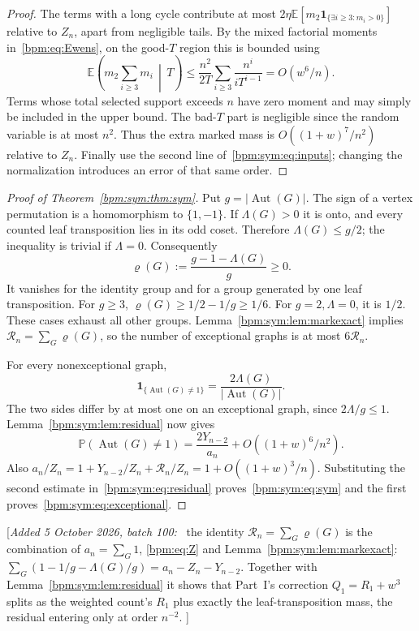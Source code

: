 \documentclass[11pt,a4paper]{article}
\theoremstyle{remark}\newtheorem{remark}[theorem]{Remark}%
\newcommand{\E}{\mathbb E}\newcommand{\Pp}{\mathbb P}
\newcommand{\Aut}{\operatorname{Aut}}\newcommand{\ee}{\mathrm e}
\newenvironment{writenote}{\par\smallskip\noindent\small[\textit{Added 5 October 2026, batch 100:}\ }{]\par\smallskip}
\begin{document}
\begin{proof}
The terms with a long cycle contribute at most $2\eta\E[m_2\mathbf1_{\{\exists i\ge3:m_i>0\}}]$ relative to $Z_n$, apart from negligible tails. By the mixed factorial moments in~\eqref{bpm:eq:Ewens}, on the good-$T$ region this is bounded using
\begin{equation}\label{bpm:sym:eq:mixed}
 \E\left(m_2\sum_{i\ge3}m_i\,\middle|\,T\right)
 \le\frac{n^2}{2T}\sum_{i\ge3}\frac{n^i}{iT^{i-1}}
 =O(w^6/n).
\end{equation}
Terms whose total selected support exceeds $n$ have zero moment and may simply be included in the upper bound. The bad-$T$ part is negligible since the random variable is at most $n^2$. Thus the extra marked mass is $O((1+w)^7/n^2)$ relative to $Z_n$. Finally use the second line of~\eqref{bpm:sym:eq:inputs}; changing the normalization introduces an error of that same order.
\end{proof}

\begin{proof}[Proof of Theorem~\ref{bpm:sym:thm:sym}]
Put $g=|\Aut(G)|$. The sign of a vertex permutation is a homomorphism to $\{1,-1\}$. If $\Lambda(G)>0$ it is onto, and every counted leaf transposition lies in its odd coset. Therefore $\Lambda(G)\le g/2$; the inequality is trivial if $\Lambda=0$. Consequently
\[
 \varrho(G):=\frac{g-1-\Lambda(G)}g\ge0.
\]
It vanishes for the identity group and for a group generated by one leaf transposition. For $g\ge3$, $\varrho(G)\ge1/2-1/g\ge1/6$. For $g=2,\Lambda=0$, it is $1/2$. These cases exhaust all other groups. Lemma~\ref{bpm:sym:lem:markexact} implies $\mathcal R_n=\sum_G \varrho(G)$, so the number of exceptional graphs is at most $6\mathcal R_n$.

For every nonexceptional graph,
\[
 \mathbf1_{\{\Aut(G)\ne1\}}=\frac{2\Lambda(G)}{|\Aut(G)|}.
\]
The two sides differ by at most one on an exceptional graph, since $2\Lambda/g\le1$. Lemma~\ref{bpm:sym:lem:residual} now gives
\[
 \Pp(\Aut(G)\ne1)=\frac{2Y_{n-2}}{a_n}
       +O((1+w)^6/n^2).
\]
Also $a_n/Z_n=1+Y_{n-2}/Z_n+\mathcal R_n/Z_n=1+O((1+w)^3/n)$. Substituting the second estimate in~\eqref{bpm:sym:eq:residual} proves~\eqref{bpm:sym:eq:sym} and the first proves~\eqref{bpm:sym:eq:exceptional}.
\end{proof}

\begin{writenote}
the identity $\mathcal R_n=\sum_G\varrho(G)$ is the combination of
$a_n=\sum_G1$, \eqref{bpm:eq:Z} and Lemma~\ref{bpm:sym:lem:markexact}:
$\sum_G(1-1/g-\Lambda(G)/g)=a_n-Z_n-Y_{n-2}$. Together with
Lemma~\ref{bpm:sym:lem:residual} it shows that Part~I's correction
$Q_1=R_1+w^3$ splits as the weighted count's $R_1$ plus exactly the
leaf-transposition mass, the residual entering only at order $n^{-2}$.
\end{writenote}
\end{document}
